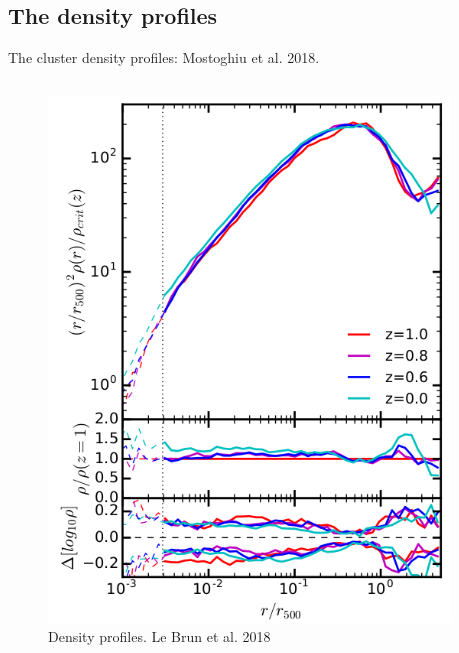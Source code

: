 \documentclass[aspectratio=43]{beamer}
\begin{document}
\subsection{The density profiles}\label{Mostoghiu}
\begin{frame}{The cluster density profiles: Mostoghiu et al. 2018.}
  \begin{columns}[t]
    \begin{column}{0.3\textwidth}
      \begin{figure}
        \includegraphics[width=\linewidth]{LeBrun18}
        \caption{Density profiles. Le Brun et al. 2018}
      \end{figure}
    \end{column}
    \begin{column}{0.7\textwidth}
\end{column}
\end{columns}
\end{frame}
\end{document}
